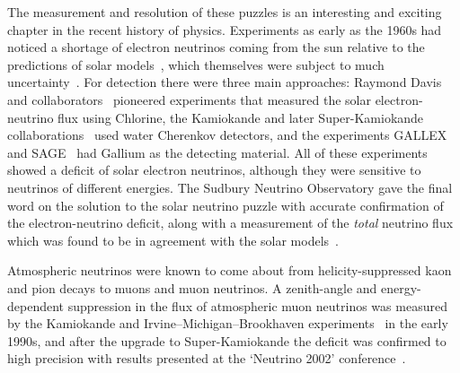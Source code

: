   The measurement and resolution of these puzzles is an interesting and exciting
  chapter in the recent history of physics. Experiments as early as the 1960s
  had noticed a shortage of electron neutrinos coming from the sun relative to
  the predictions of solar models~\cite{RevModPhys.60.297, 1988ApJ...335..415T,
    RevModPhys.64.885, RevModPhys.67.781}, which themselves were subject to much
  uncertainty~\cite{Morrison:1992bz}. For detection there were three main
  approaches: Raymond Davis and collaborators~\cite{PhysRevLett.12.303}
  pioneered experiments that measured the solar electron-neutrino flux using
  Chlorine, the Kamiokande and later Super-Kamiokande
  collaborations~\cite{Hirata:1989zj, Hirata:1990xa} used water Cherenkov
  detectors, and the experiments GALLEX~\cite{Hampel:1998xg} and
  SAGE~\cite{Abdurashitov:1999zd} had Gallium as the detecting material. All of
  these experiments showed a deficit of solar electron neutrinos, although they
  were sensitive to neutrinos of different energies. The Sudbury Neutrino
  Observatory gave the final word on the solution to the solar neutrino puzzle
  with accurate confirmation of the electron-neutrino deficit, along with a
  measurement of the \textit{total} neutrino flux which was found to be in
  agreement with the solar models~\cite{Ahmad:2001an, Ahmad:2002jz}.

  Atmospheric neutrinos were known to come about from helicity-suppressed kaon
  and pion decays to muons and muon neutrinos. A zenith-angle and
  energy-dependent suppression in the flux of atmospheric muon neutrinos was
  measured by the Kamiokande and Irvine--Michigan--Brookhaven
  experiments~\cite{Hirata:1992ku, BeckerSzendy:1995vr} in the early 1990s, and
  after the upgrade to Super-Kamiokande the deficit was confirmed to high
  precision with results presented at the `Neutrino 2002'
  conference~\cite{Fukuda:1998mi, vonFeilitzsch:2003mh, shiozawa:2002,
    Smy:2002rz}.

